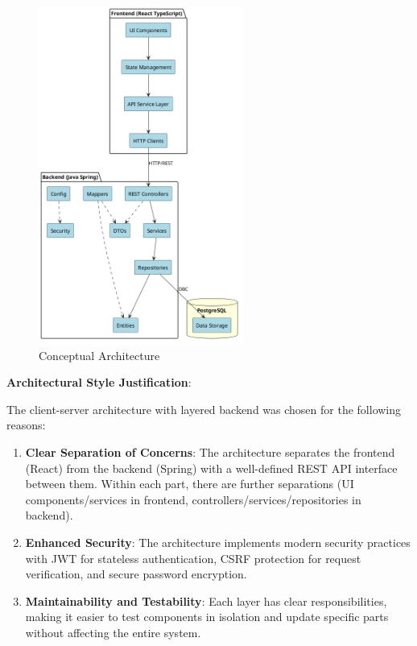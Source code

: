 \documentclass[a4paper,10pt]{article}
\begin{document}
            \begin{figure}[h]
            \centering
            \includegraphics[width=0.6\textwidth]{conceptual_architecture}
            \caption{Conceptual Architecture}
            \end{figure}

            \newpage
            \textbf{Architectural Style Justification}:

            The client-server architecture with layered backend was chosen for the following reasons:

            \begin{enumerate}
                \item \textbf{Clear Separation of Concerns}: The architecture separates the frontend (React) from the backend (Spring) with a well-defined REST API interface between them. Within each part, there are further separations (UI components/services in frontend, controllers/services/repositories in backend).

                \item \textbf{Enhanced Security}: The architecture implements modern security practices with JWT for stateless authentication, CSRF protection for request verification, and secure password encryption.

                \item \textbf{Maintainability and Testability}: Each layer has clear responsibilities, making it easier to test components in isolation and update specific parts without affecting the entire system.
            \end{enumerate}
\end{document}
